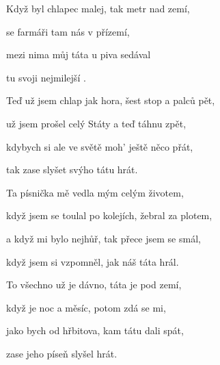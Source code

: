 

\zs
Když  byl chlapec malej, tak metr nad zemí,

 se farmáři tam  nás v přízemí,

mezi nima můj táta u piva sedával

 tu svoji nejmilejší .
\ks

\zs
Teď už jsem chlap jak hora, šest stop a palců pět,

už jsem prošel celý Státy a teď táhnu zpět,

kdybych si ale ve světě moh' ještě něco přát,

tak zase slyšet svýho tátu hrát.
\ks

\zs
Ta písnička mě vedla mým celým životem,

když jsem se toulal po kolejích, žebral za plotem,

a když mi bylo nejhůř, tak přece jsem se smál,

když jsem si vzpomněl, jak náš táta hrál.
\ks

\zs
To všechno už je dávno, táta je pod zemí,

když je noc a měsíc, potom zdá se mi,

jako bych od hřbitova, kam tátu dali spát,

zase jeho píseň slyšel hrát.
\ks

\kp







